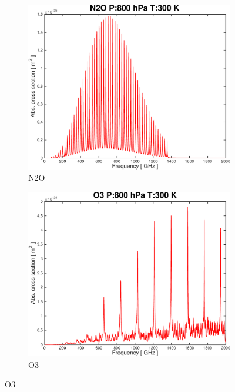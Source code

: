 \documentclass[paper=a4, fontsize=11pt]{scrartcl} %
\begin{document}
\begin{figure}[t!]
    \begin{subfigure}[b]{0.45\textwidth}
        \includegraphics[width=\textwidth]{plots/plot_xsec_N2O_800hPa_300K.pdf}
        \caption{N2O}
    \end{subfigure}
    \begin{subfigure}[b]{0.45\textwidth}
        \includegraphics[width=\textwidth]{plots/plot_xsec_O3_800hPa_300K.pdf}
        \caption{O3}
    \end{subfigure}


\end{figure}
\end{document}
